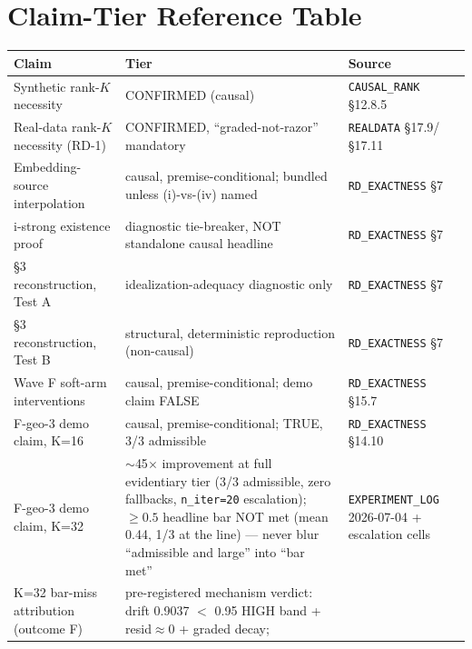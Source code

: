 \section{Claim-Tier Reference Table}
\label{sec:appendix-tiers}


\begin{table}[h]
\centering
\small
\begin{tabular}{p{3.7cm}p{5.2cm}p{3.2cm}}
\toprule
Claim & Tier & Source \\
\midrule
Synthetic rank-$K$ necessity & CONFIRMED (causal) &
  \texttt{CAUSAL\_RANK} \S12.8.5 \\
Real-data rank-$K$ necessity (RD-1) & CONFIRMED, ``graded-not-razor''
  mandatory & \texttt{REALDATA} \S17.9/\S17.11 \\
Embedding-source interpolation & causal, premise-conditional; bundled
  unless (i)-vs-(iv) named & \texttt{RD\_EXACTNESS} \S7 \\
i-strong existence proof & diagnostic tie-breaker, NOT standalone causal
  headline & \texttt{RD\_EXACTNESS} \S7 \\
\S3 reconstruction, Test A & idealization-adequacy diagnostic only &
  \texttt{RD\_EXACTNESS} \S7 \\
\S3 reconstruction, Test B & structural, deterministic reproduction
  (non-causal) & \texttt{RD\_EXACTNESS} \S7 \\
Wave F soft-arm interventions & causal, premise-conditional; demo claim
  FALSE & \texttt{RD\_EXACTNESS} \S15.7 \\
F-geo-3 demo claim, K=16 & causal, premise-conditional; TRUE, 3/3
  admissible & \texttt{RD\_EXACTNESS} \S14.10 \\
F-geo-3 demo claim, K=32 & $\sim$45$\times$ improvement at full
  evidentiary tier (3/3 admissible, zero fallbacks, \texttt{n\_iter=20}
  escalation); $\geq 0.5$ headline bar NOT met (mean 0.44, 1/3 at the
  line) --- never blur ``admissible and large'' into ``bar met'' &
  \texttt{EXPERIMENT\_LOG} 2026-07-04 + escalation cells \\
K=32 bar-miss attribution (outcome F) & pre-registered mechanism verdict:
  drift 0.9037 $<$ 0.95 HIGH band + resid$\approx$0 + graded decay;

\end{tabular}
\end{table}
